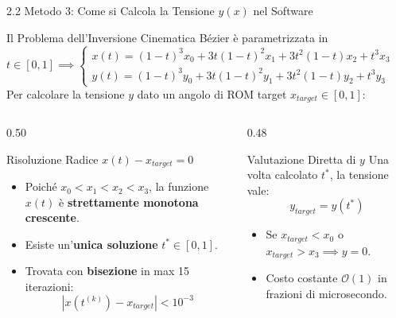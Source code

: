 \documentclass[aspectratio=169, 10pt]{beamer}
\begin{document}
\begin{frame}{2.2 Metodo 3: Come si Calcola la Tensione $y(x)$ nel Software}
    \begin{block}{Il Problema dell'Inversione Cinematica}
        Bézier è parametrizzata in $t \in [0, 1] \implies \begin{cases} x(t) = (1-t)^3 x_0 + 3t(1-t)^2 x_1 + 3t^2(1-t) x_2 + t^3 x_3 \\ y(t) = (1-t)^3 y_0 + 3t(1-t)^2 y_1 + 3t^2(1-t) y_2 + t^3 y_3 \end{cases}$ \\
        Per calcolare la tensione $y$ dato un angolo di ROM target $x_{target} \in [0, 1]$:
    \end{block}
    \vspace{0.1cm}
    \begin{columns}[T]
        \begin{column}{0.50\textwidth}
            \begin{alertblock}{Risoluzione Radice $x(t) - x_{target} = 0$}
                \begin{itemize}
                    \item Poiché $x_0 < x_1 < x_2 < x_3$, la funzione $x(t)$ è \textbf{strettamente monotona crescente}.
                    \item Esiste un'\textbf{unica soluzione} $t^* \in [0, 1]$.
                    \item Trovata con \textbf{bisezione} in max 15 iterazioni:
                    $$|x(t^{(k)}) - x_{target}| < 10^{-3}$$
                \end{itemize}
            \end{alertblock}
        \end{column}
        \begin{column}{0.48\textwidth}
            \begin{exampleblock}{Valutazione Diretta di $y$}
                Una volta calcolato $t^*$, la tensione vale:
                $$y_{target} = y(t^*)$$
                \begin{itemize}
                    \item Se $x_{target} < x_0$ o $x_{target} > x_3 \implies y = 0$.
                    \item Costo costante $\mathcal{O}(1)$ in frazioni di microsecondo.
                \end{itemize}
            \end{exampleblock}
        \end{column}
    \end{columns}
\end{frame}
\end{document}
